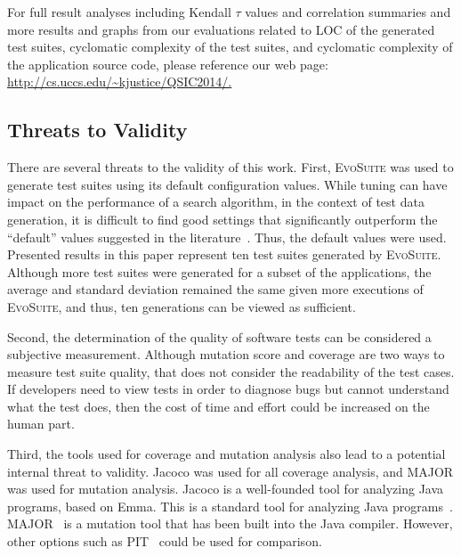 For full result analyses including Kendall $\tau$ values and correlation summaries and more results and graphs from our evaluations related to LOC of the generated test suites, cyclomatic complexity of the test suites, and cyclomatic complexity of the application source code, please reference our web page: \url{http://cs.uccs.edu/~kjustice/QSIC2014/.}

\subsection{Threats to Validity}
There are several threats to the validity of this work.
First, \textsc{EvoSuite} was used to generate test suites using its default configuration values. While tuning can have impact on the performance of a search algorithm, in the context of test data generation, it is difficult to find good settings that significantly outperform the ``default'' values suggested in the literature~\cite{arcuri2013}.  Thus, the default values were used.  Presented results in this paper represent ten test suites generated by \textsc{EvoSuite}.  Although more test suites were generated for a subset of the applications, the average and standard deviation remained the same given more executions of \textsc{EvoSuite}, and thus, ten generations can be viewed as sufficient.

Second, the determination of the quality of software tests can be considered a subjective measurement. Although mutation score and coverage are two ways to measure test suite quality, that does not consider the readability of the test cases. If developers need to view tests in order to diagnose bugs but cannot understand what the test does, then the cost of time and effort could be increased on the human part.

Third, the tools used for coverage and mutation analysis also lead to a potential internal threat to validity.  Jacoco was used for all coverage analysis, and MAJOR was used for mutation analysis.  Jacoco is a well-founded tool for analyzing Java programs, based on Emma.  This is a standard tool for analyzing Java programs~\cite{jacoco}.  MAJOR~\cite{just2011} is a mutation tool that has been built into the Java compiler. However, other options such as PIT~\cite{ pit2014} could be used for comparison. 

